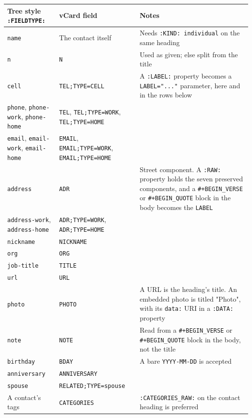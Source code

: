 \documentclass[11pt]{article}
\begin{document}
\begin{center}
\begin{tabular}{lll}
Tree style \texttt{:FIELDTYPE:} & vCard field & Notes\\[0pt]
\hline
\texttt{name} & The contact itself & Needs \texttt{:KIND: individual} on the same heading\\[0pt]
\texttt{n} & \texttt{N} & Used as given; else split from the title\\[0pt]
\texttt{cell} & \texttt{TEL;TYPE=CELL} & A \texttt{:LABEL:} property becomes a \texttt{LABEL="..."} parameter, here and in the rows below\\[0pt]
\texttt{phone}, \texttt{phone-work}, \texttt{phone-home} & \texttt{TEL}, \texttt{TEL;TYPE=WORK}, \texttt{TEL;TYPE=HOME} & \\[0pt]
\texttt{email}, \texttt{email-work}, \texttt{email-home} & \texttt{EMAIL}, \texttt{EMAIL;TYPE=WORK}, \texttt{EMAIL;TYPE=HOME} & \\[0pt]
\texttt{address} & \texttt{ADR} & Street component. A \texttt{:RAW:} property holds the seven preserved components, and a \texttt{\#+BEGIN\_VERSE} or \texttt{\#+BEGIN\_QUOTE} block in the body becomes the \texttt{LABEL}\\[0pt]
\texttt{address-work}, \texttt{address-home} & \texttt{ADR;TYPE=WORK}, \texttt{ADR;TYPE=HOME} & \\[0pt]
\texttt{nickname} & \texttt{NICKNAME} & \\[0pt]
\texttt{org} & \texttt{ORG} & \\[0pt]
\texttt{job-title} & \texttt{TITLE} & \\[0pt]
\texttt{url} & \texttt{URL} & \\[0pt]
\texttt{photo} & \texttt{PHOTO} & A URL is the heading's title. An embedded photo is titled "Photo", with its \texttt{data:} URI in a \texttt{:DATA:} property\\[0pt]
\texttt{note} & \texttt{NOTE} & Read from a \texttt{\#+BEGIN\_VERSE} or \texttt{\#+BEGIN\_QUOTE} block in the body, not the title\\[0pt]
\texttt{birthday} & \texttt{BDAY} & A bare \texttt{YYYY-MM-DD} is accepted\\[0pt]
\texttt{anniversary} & \texttt{ANNIVERSARY} & \\[0pt]
\texttt{spouse} & \texttt{RELATED;TYPE=spouse} & \\[0pt]
A contact's tags & \texttt{CATEGORIES} & \texttt{:CATEGORIES\_RAW:} on the contact heading is preferred\\[0pt]
\end{tabular}
\end{center}
\end{document}
